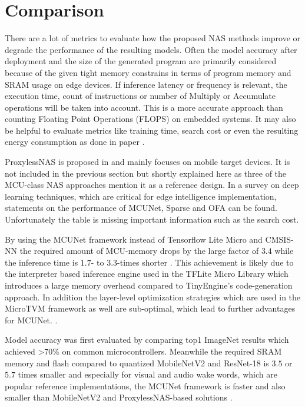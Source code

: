 \documentclass[10pt,        %
               a4paper,     %
               journal,     %
               ]{IEEEtran}
\begin{document}
\section{Comparison}\label{sec:comp}

There are a lot of metrics to evaluate how the proposed NAS methods improve or degrade the performance of the resulting models. Often the model accuracy after deployment and the size of the generated program are primarily considered because of the given tight memory constrains in terms of program memory and SRAM usage on edge devices. If inference latency or frequency is relevant, the execution time, count of instructions or number of Multiply or Accumulate operations will be taken into account. This is a more accurate approach than counting Floating Point Operations (FLOPS) on embedded systems. It may also be helpful to evaluate metrics like training time, search cost or even the resulting energy consumption as done in paper \cite{once4all2019}.

ProxylessNAS is proposed in \cite{proxyless2018} and mainly focuses on mobile target devices. It is not included in the previous section but shortly explained here as three of the MCU-class NAS approaches mention it as a reference design. In \cite{ai2edge2020} a survey on deep learning techniques, which are critical for edge intelligence implementation, statements on the performance of MCUNet, Sparse and OFA can be found. Unfortunately the table is missing important information such as the search cost.

By using the MCUNet framework instead of Tensorflow Lite Micro and CMSIS-NN the required amount of MCU-memory drops by the large factor of $3.4$ while the inference time is $1.7$- to $3.3$-times shorter  \cite{mcunet2020}. This achievement is likely due to the interpreter based inference engine used in the TFLite Micro Library which introduces a large memory overhead compared to TinyEngine's code-generation approach. In addition the layer-level optimization strategies which are used in the MicroTVM framework as well are sub-optimal, which lead to further advantages for MCUNet. \cite{mcunet2020}.

Model accuracy was first evaluated by comparing top1 ImageNet results which achieved >70\% on common microcontrollers. Meanwhile the required SRAM memory and flash compared to quantized MobileNetV2 and ResNet-18 is $3.5$ or $5.7$ times smaller and especially for visual and audio wake words, which are popular reference implementations, the MCUNet framework is faster and also smaller than MobileNetV2 and ProxylessNAS-based solutions \cite{mcunet2020}.
\end{document}
